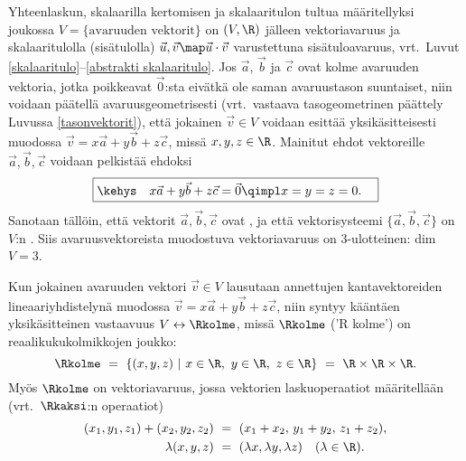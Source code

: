 Yhteenlaskun, skalaarilla kertomisen ja skalaaritulon tultua määritellyksi joukossa 
$V=\{\text{avaruuden vektorit}\}$ on $(V,\R)$ jälleen vektoriavaruus ja skalaaritulolla 
(sisätulolla) $\vec u,\vec v \map \vec u\cdot\vec v$ varustettuna sisätuloavaruus, 
vrt.\ Luvut \ref{skalaaritulo}--\ref{abstrakti skalaaritulo}. 
Jos $\vec a$, $\vec b$ ja $\vec c$ ovat kolme
avaruuden vektoria, jotka poikkeavat $\vec 0$:sta eivätkä ole saman avaruustason suuntaiset,
niin voidaan päätellä avaruusgeometrisesti (vrt.\ vastaava tasogeometrinen päättely Luvussa
\ref{tasonvektorit}), että jokainen $\vec v \in V$ voidaan esittää yksikäsitteisesti muodossa
$\vec v=x\vec a+y\vec b+z\vec c$, missä $x,y,z\in\R$. Mainitut ehdot vektoreille 
$\vec a,\vec b,\vec c$ voidaan pelkistää ehdoksi
%
\[
\boxed{\kehys\quad x\vec a+y\vec b+z\vec c=\vec 0 \qimpl x=y=z=0. \quad}
\]
Sanotaan tällöin, että vektorit $\vec a,\vec b,\vec c$ ovat ,
ja että vektorisysteemi $\{\vec a,\vec b,\vec c\}$ on $V$:n
%
. Siis avaruusvektoreista muodostuva vektoriavaruus on $3$-ulotteinen: dim $V=3$.

Kun jokainen avaruuden vektori $\vec v \in V$ lausutaan annettujen kantavektoreiden 
lineaariyhdistelynä muodossa $\vec v = x\vec a+y\vec b+z\vec c$, niin syntyy kääntäen 
yksikäsitteinen vastaavuus $V \leftrightarrow \Rkolme$, missä $\Rkolme$ ('R kolme') on 
reaalikukukolmikkojen joukko:
\[
\Rkolme\ =\ \{ (x,y,z) \ | \ x \in \R, \ y \in \R, \ z \in \R \}\ =\ \R \times \R \times \R.
\]
%
Myös $\Rkolme$ on vektoriavaruus, jossa vektorien laskuoperaatiot määritellään 
(vrt.\ $\Rkaksi$:n operaatiot)
\begin{align*}
(x_1,y_1,z_1)+(x_2,y_2,z_2)\ &=\ (x_1+x_2,\,y_1+y_2,\,z_1+z_2), \\
             \lambda(x,y,z)\ &=\ (\lambda x,\lambda y,\lambda z) \quad (\lambda\in\R).
\end{align*}


